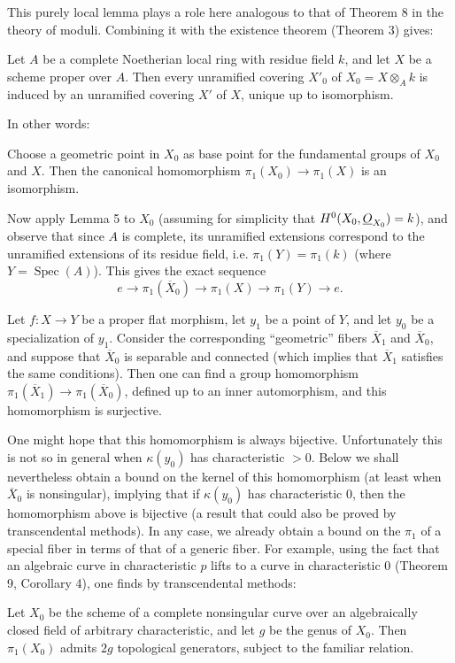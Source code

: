 This purely local lemma plays a role here analogous to that of Theorem 8 in
the theory of moduli. Combining it with the existence theorem (Theorem 3)
gives:

 Let $A$ be a complete Noetherian local ring with residue
field $k$, and let $X$ be a scheme proper over $A$. Then every unramified
covering $X'_0$ of $X_0=X\otimes_A k$ is induced by an unramified covering
$X'$ of $X$, unique up to isomorphism.

In other words:

 Choose a geometric point in $X_0$ as base point for the
fundamental groups of $X_0$ and $X$. Then the canonical homomorphism
$\pi_1(X_0)\longrightarrow\pi_1(X)$ is an isomorphism.

Now apply Lemma 5 to $X_0$ (assuming for simplicity that
$H^0(X_0,\underline{O}_{X_0})=k$), and observe that since $A$ is complete, its
unramified extensions correspond to the unramified extensions of its residue
field, i.e. $\pi_1(Y)=\pi_1(k)$ (where $Y=\operatorname{Spec}(A)$). This gives
the exact sequence
\[
  e\longrightarrow\pi_1(\overline X_0)
  \longrightarrow\pi_1(X)\longrightarrow\pi_1(Y)\longrightarrow e.
\]

 Let $f:X\longrightarrow Y$ be a proper flat morphism,
let $y_1$ be a point of $Y$, and let $y_0$ be a specialization of $y_1$.
Consider the corresponding “geometric” fibers $\overline X_1$ and
$\overline X_0$, and suppose that $\overline X_0$ is separable and connected
(which implies that $\overline X_1$ satisfies the same conditions). Then one
can find a group homomorphism
$\pi_1(\overline X_1)\longrightarrow\pi_1(\overline X_0)$, defined up to an
inner automorphism, and this homomorphism is surjective.

One might hope that this homomorphism is always bijective. Unfortunately this
is not so in general when $\kappa(y_0)$ has characteristic $>0$. Below we shall
nevertheless obtain a bound on the kernel of this homomorphism (at least when
$\overline X_0$ is nonsingular), implying that if $\kappa(y_0)$ has
characteristic $0$, then the homomorphism above is bijective (a result that
could also be proved by transcendental methods). In any case, we already
obtain a bound on the $\pi_1$ of a special fiber in terms of that of a generic
fiber. For example, using the fact that an algebraic curve in characteristic
$p$ lifts to a curve in characteristic $0$ (Theorem 9, Corollary 4), one finds
by transcendental methods:

 Let $X_0$ be the scheme of a complete nonsingular curve
over an algebraically closed field of arbitrary characteristic, and let $g$ be
the genus of $X_0$. Then $\pi_1(X_0)$ admits $2g$ topological generators,
subject to the familiar relation.


